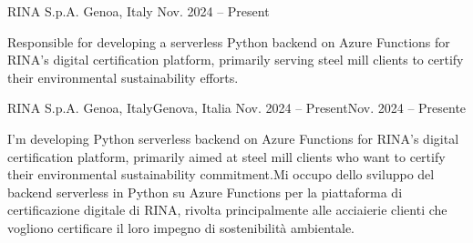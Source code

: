 


\begin{cventries}


\ifenglish
{} %
{RINA S.p.A.} %
{Genoa, Italy} %
{Nov. 2024 -- Present} %
{ %
\begin{cvitems}
  \item {Responsible for developing a serverless Python backend on Azure Functions for RINA's digital certification platform, primarily serving steel mill clients to certify their environmental sustainability efforts.}
\end{cvitems}
}
\else
{} %
{RINA S.p.A.} %
{\ifenglish Genoa, Italy\else Genova, Italia\fi} %
{\ifenglish Nov. 2024 -- Present\else Nov. 2024 -- Presente\fi} %
{ %
\begin{cvitems}
  \item {\ifenglish I'm developing Python serverless backend on Azure Functions for RINA's digital certification platform, primarily aimed at steel mill clients who want to certify their environmental sustainability commitment.\else Mi occupo dello sviluppo del backend serverless in Python su Azure Functions per la piattaforma di certificazione digitale di RINA, rivolta principalmente alle acciaierie clienti che vogliono certificare il loro impegno di sostenibilità ambientale.\fi}
\end{cvitems}
}
\fi



\end{cventries}
